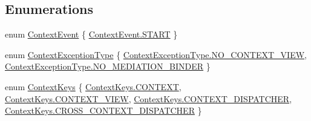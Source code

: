 \subsection*{Enumerations}
\begin{DoxyCompactItemize}
\item 
enum \hyperlink{namespacestrange_1_1extensions_1_1context_1_1api_a92a831a11b0bd5ee051b35745b33791a}{Context\-Event} \{ \hyperlink{namespacestrange_1_1extensions_1_1context_1_1api_a92a831a11b0bd5ee051b35745b33791aab078ffd28db767c502ac367053f6e0ac}{Context\-Event.\-S\-T\-A\-R\-T}
 \}
\item 
enum \hyperlink{namespacestrange_1_1extensions_1_1context_1_1api_a60b937d6295cc72fe4b26e4f9d671283}{Context\-Exception\-Type} \{ \hyperlink{namespacestrange_1_1extensions_1_1context_1_1api_a60b937d6295cc72fe4b26e4f9d671283ac6443b3577afe97292f19a0f2b0b4d89}{Context\-Exception\-Type.\-N\-O\-\_\-\-C\-O\-N\-T\-E\-X\-T\-\_\-\-V\-I\-E\-W}, 
\hyperlink{namespacestrange_1_1extensions_1_1context_1_1api_a60b937d6295cc72fe4b26e4f9d671283a0e2fd9683c004efce35e8c0113667bba}{Context\-Exception\-Type.\-N\-O\-\_\-\-M\-E\-D\-I\-A\-T\-I\-O\-N\-\_\-\-B\-I\-N\-D\-E\-R}
 \}
\item 
enum \hyperlink{namespacestrange_1_1extensions_1_1context_1_1api_a64d630fc6451680225841051a568f4d6}{Context\-Keys} \{ \hyperlink{namespacestrange_1_1extensions_1_1context_1_1api_a64d630fc6451680225841051a568f4d6a03dcdeb793b893c48eda7952aac3c03c}{Context\-Keys.\-C\-O\-N\-T\-E\-X\-T}, 
\hyperlink{namespacestrange_1_1extensions_1_1context_1_1api_a64d630fc6451680225841051a568f4d6a160006392e2747e6b3e5f663a9e1b953}{Context\-Keys.\-C\-O\-N\-T\-E\-X\-T\-\_\-\-V\-I\-E\-W}, 
\hyperlink{namespacestrange_1_1extensions_1_1context_1_1api_a64d630fc6451680225841051a568f4d6aee8b94342ad445619c9959a6745bd3c1}{Context\-Keys.\-C\-O\-N\-T\-E\-X\-T\-\_\-\-D\-I\-S\-P\-A\-T\-C\-H\-E\-R}, 
\hyperlink{namespacestrange_1_1extensions_1_1context_1_1api_a64d630fc6451680225841051a568f4d6a500faa82c964b0f9d1fd9b236b7e8901}{Context\-Keys.\-C\-R\-O\-S\-S\-\_\-\-C\-O\-N\-T\-E\-X\-T\-\_\-\-D\-I\-S\-P\-A\-T\-C\-H\-E\-R}
 \}
\end{DoxyCompactItemize}


